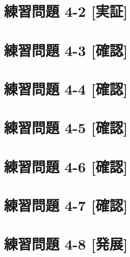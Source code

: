 \documentclass[
]{book}
\begin{document}
\hypertarget{ux7df4ux7fd2ux554fux984c-4-2-ux5b9fux8a3c}{%
\section*{練習問題 4-2 {[}実証{]}}\label{ux7df4ux7fd2ux554fux984c-4-2-ux5b9fux8a3c}}

\hypertarget{ux7df4ux7fd2ux554fux984c-4-3-ux78baux8a8d}{%
\section*{練習問題 4-3 {[}確認{]}}\label{ux7df4ux7fd2ux554fux984c-4-3-ux78baux8a8d}}

\hypertarget{ux7df4ux7fd2ux554fux984c-4-4-ux78baux8a8d}{%
\section*{練習問題 4-4 {[}確認{]}}\label{ux7df4ux7fd2ux554fux984c-4-4-ux78baux8a8d}}

\hypertarget{ux7df4ux7fd2ux554fux984c-4-5-ux78baux8a8d}{%
\section*{練習問題 4-5 {[}確認{]}}\label{ux7df4ux7fd2ux554fux984c-4-5-ux78baux8a8d}}

\hypertarget{ux7df4ux7fd2ux554fux984c-4-6-ux78baux8a8d}{%
\section*{練習問題 4-6 {[}確認{]}}\label{ux7df4ux7fd2ux554fux984c-4-6-ux78baux8a8d}}

\hypertarget{ux7df4ux7fd2ux554fux984c-4-7-ux78baux8a8d}{%
\section*{練習問題 4-7 {[}確認{]}}\label{ux7df4ux7fd2ux554fux984c-4-7-ux78baux8a8d}}

\hypertarget{ux7df4ux7fd2ux554fux984c-4-8-ux767aux5c55}{%
\section*{練習問題 4-8 {[}発展{]}}\label{ux7df4ux7fd2ux554fux984c-4-8-ux767aux5c55}}
\end{document}
